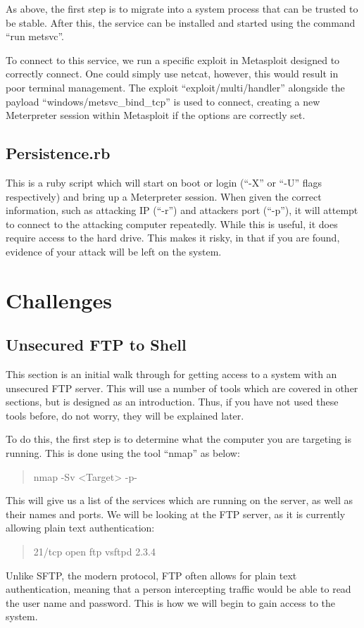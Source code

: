 \documentclass[a4paper,11pt]{report}
\begin{document}
			As above, the first step is to migrate into a system process that can be trusted to be stable. 
			After this, the service can be installed and started using the command ``run metsvc''. 

			To connect to this service, we run a specific exploit in Metasploit designed to correctly connect. 
			One could simply use netcat, however, this would result in poor terminal management. 
			The exploit ``exploit/multi/handler'' alongside the payload ``windows/metsvc\_bind\_tcp'' is used to connect, creating a new Meterpreter session within Metasploit if the options are correctly set. 
			
		\subsection{Persistence.rb}
			This is a ruby script which will start on boot or login (``-X'' or ``-U'' flags respectively) and bring up a Meterpreter session. 
			When given the correct information, such as attacking IP (``-r'') and attackers port (``-p''), it will attempt to connect to the attacking computer repeatedly. 
			While this is useful, it does require access to the hard drive. 
			This makes it risky, in that if you are found, evidence of your attack will be left on the system. 
	\section{Challenges}
		\subsection{Unsecured FTP to Shell}
			This section is an initial walk through for getting access to a system with an unsecured FTP server. 
			This will use a number of tools which are covered in other sections, but is designed as an introduction. 
			Thus, if you have not used these tools before, do not worry, they will be explained later. 

			To do this, the first step is to determine what the computer you are targeting is running. 
			This is done using the tool ``nmap'' as below:
			\begin{quote}
				nmap -Sv <Target> -p-
			\end{quote}
			This will give us a list of the services which are running on the server, as well as their names and ports. 
			We will be looking at the FTP server, as it is currently allowing plain text authentication:
			\begin{quote}
				21/tcp    open  ftp         vsftpd 2.3.4
			\end{quote}
			Unlike SFTP, the modern protocol, FTP often allows for plain text authentication, meaning that a person intercepting traffic would be able to read the user name and password. 
			This is how we will begin to gain access to the system. 
\end{document}
